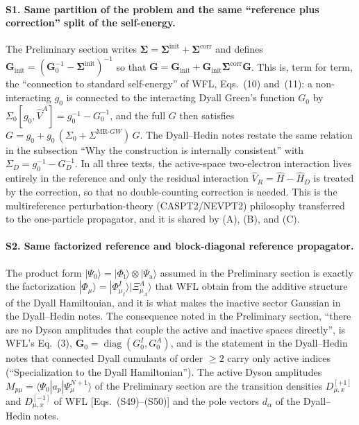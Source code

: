 \documentclass[11pt,a4paper]{article}
\newcommand{\bG}{\boldsymbol{G}}
\newcommand{\bSigma}{\boldsymbol{\Sigma}}
\newcommand{\ket}[1]{|#1\rangle}
\newcommand{\braket}[1]{\langle#1\rangle}
\newcommand{\WFL}{WFL}
\newcommand{\Pre}{Preliminary section}
\newcommand{\DHN}{Dyall--Hedin notes}
\begin{document}
\paragraph{S1. Same partition of the problem and the same ``reference plus
correction'' split of the self-energy.}
The \Pre{} writes $\bSigma=\bSigma^{\text{init}}+\bSigma^{\text{corr}}$ and
defines $\bG_{\text{init}}=(\bG_0^{-1}-\bSigma^{\text{init}})^{-1}$ so that
$\bG=\bG_{\text{init}}+\bG_{\text{init}}\bSigma^{\text{corr}}\bG$.  This is,
term for term, the ``connection to standard self-energy'' of \WFL{}, Eqs.~(10)
and~(11): a non-interacting $g_0$ is connected to the interacting Dyall
Green's function $G_0$ by $\Sigma_0[g_0,\hat V^A]=g_0^{-1}-G_0^{-1}$, and the
full $G$ then satisfies
$G=g_0+g_0\,(\Sigma_0+\Sigma^{\text{MR-}GW})\,G$.  The \DHN{} restate the same
relation in the subsection ``Why the construction is internally consistent''
with $\Sigma_D=g_0^{-1}-G_D^{-1}$.  In all three texts, the active-space
two-electron interaction lives entirely in the reference and only the residual
interaction $\hat V_R=\hat H-\hat H_D$ is treated by the correction, so that
no double-counting correction is needed.  This is the multireference
perturbation-theory (CASPT2/NEVPT2) philosophy transferred to the one-particle
propagator, and it is shared by (A), (B), and (C).

\paragraph{S2. Same factorized reference and block-diagonal reference
propagator.}
The product form $\ket{\Psi_0}=\ket{\Phi_{\mathrm i}}\otimes\ket{\Psi_{\mathrm a}}$
assumed in the \Pre{} is exactly the factorization
$\ket{\Phi_\mu}=\ket{\Phi^I_{\mu_I}}\ket{\Xi^A_{\mu_A}}$ that \WFL{} obtain
from the additive structure of the Dyall Hamiltonian, and it is what makes the
inactive sector Gaussian in the \DHN{}.  The consequence noted in the
\Pre{}, ``there are no Dyson amplitudes that couple the active and inactive
spaces directly'', is \WFL{}'s Eq.~(3), $\mathbf G_0=\operatorname{diag}(G_0^I,G_0^A)$,
and is the statement in the \DHN{} that connected Dyall cumulants of order
$\ge2$ carry only active indices (``Specialization to the Dyall
Hamiltonian'').  The active Dyson amplitudes
$M_{p\mu}=\braket{\Psi_0|a_p|\Psi_\mu^{N+1}}$ of the \Pre{} are the transition
densities $D^{[+1]}_{\mu,x}$ and $D^{[-1]}_{\mu,x}$ of \WFL{} [Eqs.~(S49)--(S50)]
and the pole vectors $d_\alpha$ of the \DHN{}.
\end{document}

